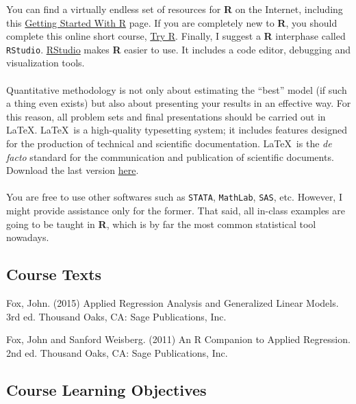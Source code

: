 \documentclass[letterpaper]{article}
\renewenvironment{itemize}{
  \begin{list}{}{
    \setlength{\leftmargin}{1.5em}
  }
}{
  \end{list}
}
\begin{document}
You can find a virtually endless set of resources for {\bf R} on the Internet, including this \href{http://scs.math.yorku.ca/index.php/R:_Getting_started_with_R}{Getting Started With R} page. If you are completely new to {\bf R}, you should complete this online short course, \href{http://tryr.codeschool.com/}{Try R}. Finally, I suggest a {\bf R} interphase called \texttt{RStudio}. \href{https://www.rstudio.com/products/rstudio/download/}{RStudio} makes {\bf R} easier to use. It includes a code editor, debugging and visualization tools.
\\
\\
Quantitative methodology is not only about estimating the ``best'' model (if such a thing even exists) but also about presenting your results in an effective way. For this reason, all problem sets and final presentations should be carried out in \LaTeX. \LaTeX\, is a high-quality typesetting system; it includes features designed for the production of technical and scientific documentation. \LaTeX\, is the \emph{de facto} standard for the communication and publication of scientific documents. Download the last version \href{https://www.latex-,roject.org/get/}{here}.
\\
\\
You are free to use other softwares such as \texttt{STATA}, \texttt{MathLab}, \texttt{SAS}, etc. However, I might provide assistance only for the former. That said, all in-class examples are going to be taught in {\bf R}, which is by far the most common statistical tool nowadays. 

\subsection*{Course Texts}

\begin{itemize}
	\item[$\bullet$] Fox, John. (2015) Applied Regression Analysis and Generalized Linear Models. 3rd ed. Thousand Oaks, CA: Sage Publications, Inc.
	\item[$\bullet$] Fox, John and Sanford Weisberg. (2011) An R Companion to Applied Regression. 2nd ed. Thousand Oaks, CA: Sage Publications, Inc.
\end{itemize}


\subsection*{Course Learning Objectives}
 
\end{document}

